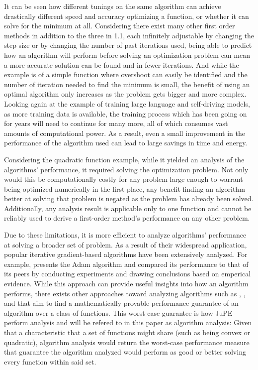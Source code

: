 It can be seen how different tunings on the same algorithm can achieve drastically different speed and accuracy optimizing a function, or whether it can solve for the minimum at all. Considering there exist many other first order methods in addition to the three in 1.1, each infinitely adjustable by changing the step size or by changing the number of past iterations used, being able to predict how an algorithm will perform before solving an optimization problem can mean a more accurate solution can be found and in fewer iterations. And while the example is of a simple function where overshoot can easily be identified and the number of iteration needed to find the minimum is small, the benefit of using an optimal algorithm only increases as the problem gets bigger and more complex. Looking again at the example of training large language and self-driving models, as more training data is available, the training process which has been going on for years will need to continue for many more, all of which consumes vast amounts of computational power. As a result, even a small improvement in the performance of the algorithm used can lead to large savings in time and energy.

Considering the quadratic function example, while it yielded an analysis of the algorithms' performance, it required solving the optimization problem. Not only would this be computationally costly for any problem large enough to warrant being optimized numerically in the first place, any benefit finding an algorithm better at solving that problem is negated as the problem has already been solved. Additionally, any analysis result is applicable only to one function and cannot be reliably used to derive a first-order method's performance on any other problem.

Due to these limitations, it is more efficient to analyze algorithms' performance at solving a broader set of problem. As a result of their widespread application, popular iterative gradient-based algorithms have been extensively analyzed. For example, \cite{adam} presents the Adam algorithm and compared its performance to that of its peers by conducting experiments and drawing conclusions based on emperical evidence. While this approach can provide useful insights into how an algorithm performs, there exists other approaches toward analyzing algorithms such as \cite{drori2012}, \cite{taylor2016}, and \cite{lessard2016} that aim to find a mathematically provable performance guarantee of an algorithm over a class of functions. This worst-case guarantee is how JuPE perform analysis and will be refered to in this paper as algorithm analysis: Given that a characteristic that a set of functions might share (such as being convex or quadratic), algorithm analysis would return the worst-case performance measure that guarantee the algorithm analyzed would perform as good or better solving every function within said set.

